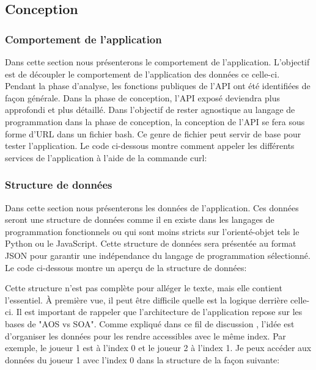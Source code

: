 \documentclass[12pt]{article}
\begin{document}
\subsection{Conception}

\subsubsection{Comportement de l'application}

Dans cette section nous présenterons le comportement de l'application. L'objectif est de découpler le comportement de l'application des données ce celle-ci. Pendant la phase d'analyse, les fonctions publiques de l'API ont été identifiées de façon générale. Dans la phase de conception, l'API exposé deviendra plus approfondi et plus détaillé. Dans l'objectif de rester agnostique au langage de programmation dans la phase de conception, la conception de l'API se fera sous forme d'URL dans un fichier bash. Ce genre de fichier peut servir de base pour tester l'application. Le code ci-dessous montre comment appeler les différents services de l'application à l'aide de la commande curl:



\subsubsection{Structure de données}

Dans cette section nous présenterons les données de l'application. Ces données seront une structure de données comme il en existe dans les langages de programmation fonctionnels ou qui sont moins stricts sur l'orienté-objet tels le Python ou le JavaScript. Cette structure de données sera présentée au format JSON pour garantir une indépendance du langage de programmation sélectionné. Le code ci-dessous montre un aperçu de la structure de données:



Cette structure n'est pas complète pour alléger le texte, mais elle contient l'essentiel. À première vue, il peut être difficile quelle est la logique derrière celle-ci. Il est important de rappeler que l'architecture de l'application repose sur les bases de "AOS vs SOA". Comme expliqué dans ce fil de discussion \cite{SOA_AOS_HN}, l'idée est d'organiser les données pour les rendre accessibles avec le même index. Par exemple, le joueur 1 est à l'index 0 et le joueur 2 à l'index 1. Je peux accéder aux données du joueur 1 avec l'index 0 dans la structure de la façon suivante:
\end{document}
